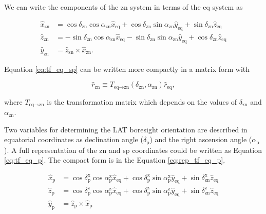 We can write the components of the zn system in terms of the eq system as

\begin{equation}
    \begin{split}
    \hat{x}_\text{zn} &= \cos\delta_\text{zn}\cos\alpha_\text{zn}\hat{x}_\text{eq} + \cos\delta_\text{zn}\sin\alpha_\text{zn}\hat{y}_\text{eq} + \sin\delta_\text{zn}\hat{z}_\text{eq}\\
    \hat{z}_\text{zn} &= - \sin\delta_\text{zn}\cos\alpha_\text{zn}\hat{x}_\text{eq} - \sin\delta_\text{zn}\sin\alpha_\text{zn}\hat{y}_\text{eq} + \cos\delta_\text{zn}\hat{z}_\text{eq} \\
    \hat{y}_\text{zn} &= \hat{z}_\text{zn} \times \hat{x}_\text{zn}.
    \end{split}
    \label{eq:tf_eq_sp}
\end{equation}

Equation \ref{eq:tf_eq_sp} can be written more
compactly in a matrix form with

\begin{equation}
    \hat{r}_\text{zn} \equiv T_{\text{eq}\rightarrow\text{zn}} (\delta_\text{zn}, \alpha_\text{zn}) \hat{r}_\text{eq},
    \label{eq:rep_tf_eq_sp}
\end{equation}

where $T_{\text{eq}\rightarrow\text{zn}}$ is the transformation matrix which depends on the
values of $\delta_\text{zn}$ and $\alpha_\text{zn}$.


Two variables for determining the LAT boresight
orientation are described 
in equatorial coordinates as declination angle ($\delta_\text{p}$)
and the right ascension angle ($\alpha_\text{p}$).
A full representation of the zn and sp coordinates could
be written as Equation \ref{eq:tf_eq_p}.
The compact form is in the Equation \ref{eq:rep_tf_eq_p}.

\begin{equation}
    \begin{split}
    \hat{x}_\text{p} &= \cos\delta^\text{x}_\text{p}\cos\alpha^\text{x}_\text{p}\hat{x}_\text{eq} + \cos\delta^\text{x}_\text{p}\sin\alpha^\text{x}_\text{p}\hat{y}_\text{eq} + \sin\delta^\text{x}_\text{zn}\hat{z}_\text{eq}\\
    \hat{z}_\text{p} &= \cos\delta^\text{z}_\text{p}\cos\alpha^\text{z}_\text{p}\hat{x}_\text{eq} + \cos\delta^\text{z}_\text{p}\sin\alpha^\text{z}_\text{p}\hat{y}_\text{eq} + \sin\delta^\text{z}_\text{zn}\hat{z}_\text{eq}\\
    \hat{y}_\text{p} &= \hat{z}_\text{p} \times \hat{x}_\text{p}
    \end{split}
    \label{eq:tf_eq_p}
\end{equation}

